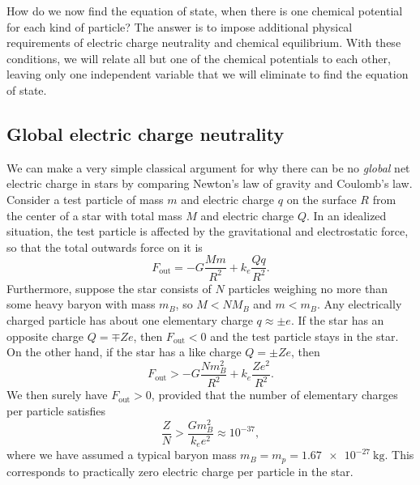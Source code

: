 How do we now find the equation of state, when there is one chemical potential for each kind of particle?
The answer is to impose additional physical requirements of electric charge neutrality and chemical equilibrium.
With these conditions, we will relate all but one of the chemical potentials to each other, leaving only one independent variable that we will eliminate to find the equation of state.

\subsection{Global electric charge neutrality}


We can make a very simple classical argument for why there can be no \emph{global} net electric charge in stars by comparing Newton's law of gravity and Coulomb's law.
Consider a test particle of mass $m$ and electric charge $q$ on the surface $R$ from the center of a star with total mass $M$ and electric charge $Q$.
In an idealized situation, the test particle is affected by the gravitational and electrostatic force, so that the total outwards  force on it is
\begin{equation}
	F_\text{out} = -G \frac{M m}{R^2} + k_e \frac{Q q}{R^2} .
\end{equation}
Furthermore, suppose the star consists of $N$ particles weighing  no more than some heavy baryon with mass $m_B$, so $M < N M_B$ and $m < m_B$.
Any electrically charged particle has about one elementary charge $q \approx \pm e$.
If the star has an opposite charge $Q = \mp Z e$, then $F_\text{out} < 0$ and the test particle stays in the star.
On the other hand, if the star has a like charge $Q = \pm Z e$, then
\begin{equation}
	F_\text{out} > -G \frac{N m_B^2}{R^2} + k_e \frac{Z e^2}{R^2} .
\end{equation}
We then surely have $F_\text{out} > 0$, provided that the number of elementary charges per particle satisfies
\begin{equation}
	\frac{Z}{N} > \frac{G m_B^2}{k_e e^2} \approx 10^{-37} ,
\end{equation}
where we have assumed a typical baryon mass $m_B = m_p = \SI{1.67e-27}{\kilogram}$.
This corresponds to practically zero electric charge per particle in the star.

